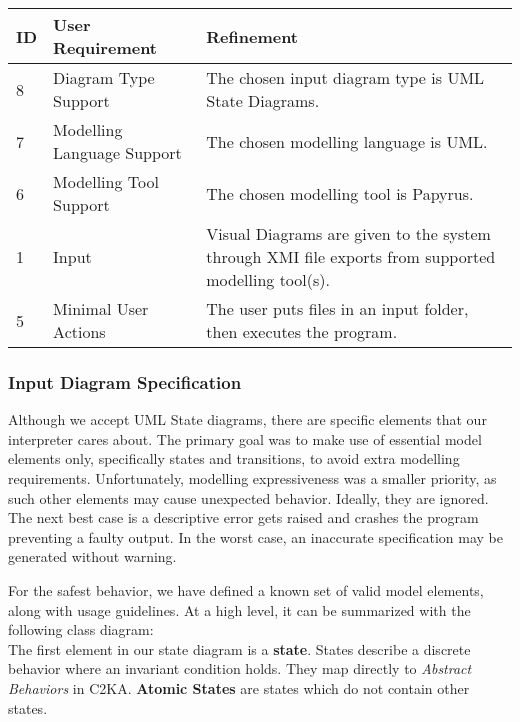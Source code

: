 \documentclass[11pt]{article}
\begin{document}
    \begin{table}[htbp]
    \centering
    \begin{tabularx}{\textwidth}{| l | l | X |}
        \hline
        \textbf{ID} & \textbf{User Requirement} & \textbf{Refinement} \\
        \hline
        8 & Diagram Type Support & The chosen input diagram type is UML State Diagrams. \\ \hline
        7 & Modelling Language Support & The chosen modelling language is UML. \\ \hline
        6 & Modelling Tool Support & The chosen modelling tool is Papyrus. \\ \hline
        1 & Input & Visual Diagrams are given to the system through XMI file exports from supported modelling tool(s). \\ \hline
        5 & Minimal User Actions & The user puts files in an input folder, then executes the program.  \\ \hline
    \end{tabularx}\label{tab:input-table}
    \end{table}

    \subsubsection{Input Diagram Specification}\label{subsubsec:input-specification}
    Although we accept UML State diagrams, there are specific elements that our interpreter cares about.
    The primary goal was to make use of essential model elements only, specifically states and transitions,
    to avoid extra modelling requirements.
    Unfortunately, modelling expressiveness was a smaller priority, as such
    other elements may cause unexpected behavior.
    Ideally, they are ignored.
    The next best case is a descriptive error gets raised and crashes the program preventing a faulty output.
    In the worst case, an inaccurate specification may be generated without warning.

    For the safest behavior, we have defined a known set of valid model elements, along with usage guidelines.
    At a high level, it can be summarized with the following class diagram:
    \\

    The first element in our state diagram is a \textbf{state}.
    States describe a discrete behavior where an invariant condition holds.
    They map directly to \textit{Abstract Behaviors} in C2KA\@.
    \textbf{Atomic States} are states which do not contain other states.
\end{document}
